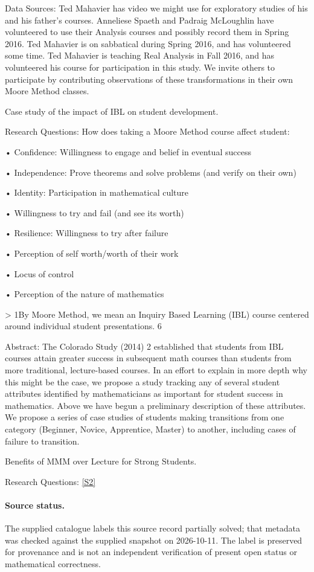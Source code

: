 \documentclass[11pt]{article}
\newcommand{\sref}[2]{\hyperlink{source:#1:#2}{[S#2]}}
\begin{document}
Data Sources: Ted Mahavier has video we might use for exploratory studies of his and his father's courses. Anneliese Spaeth and Padraig McLoughlin have volunteered to use their Analysis courses and possibly record them in Spring 2016. Ted Mahavier is on sabbatical during Spring 2016, and has volunteered some time. Ted Mahavier is teaching Real Analysis in Fall 2016, and has volunteered his course for participation in this study. We invite others to participate by contributing observations of these transformations in their own Moore Method classes.

Case study of the impact of IBL on student development.

Research Questions: How does taking a Moore Method course affect student:

• Confidence: Willingness to engage and belief in eventual success

• Independence: Prove theorems and solve problems (and verify on their own)

• Identity: Participation in mathematical culture

• Willingness to try and fail (and see its worth)

• Resilience: Willingness to try after failure

• Perception of self worth/worth of their work

• Locus of control

• Perception of the nature of mathematics

> 1By Moore Method, we mean an Inquiry Based Learning (IBL) course centered around individual student presentations. 6

Abstract: The Colorado Study (2014) 2 established that students from IBL courses attain greater success in subsequent math courses than students from more traditional, lecture-based courses. In an effort to explain in more depth why this might be the case, we propose a study tracking any of several student attributes identified by mathematicians as important for student success in mathematics. Above we have begun a preliminary description of these attributes. We propose a series of case studies of students making transitions from one category (Beginner, Novice, Apprentice, Master) to another, including cases of failure to transition.

Benefits of MMM over Lecture for Strong Students.

Research Questions: \sref{statement}{2}
\paragraph{Source status.}
The supplied catalogue labels this source record partially solved; that metadata was checked against the supplied snapshot on 2026-10-11. The label is preserved for provenance and is not an independent verification of present open status or mathematical correctness.
\end{document}
